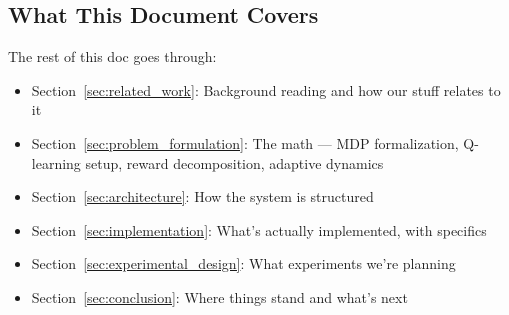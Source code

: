 \subsection{What This Document Covers}

The rest of this doc goes through:
\begin{itemize}
    \item Section~\ref{sec:related_work}: Background reading and how our stuff relates to it
    \item Section~\ref{sec:problem_formulation}: The math --- MDP formalization, Q-learning setup, reward decomposition, adaptive dynamics
    \item Section~\ref{sec:architecture}: How the system is structured
    \item Section~\ref{sec:implementation}: What's actually implemented, with specifics
    \item Section~\ref{sec:experimental_design}: What experiments we're planning
    \item Section~\ref{sec:conclusion}: Where things stand and what's next
\end{itemize}
